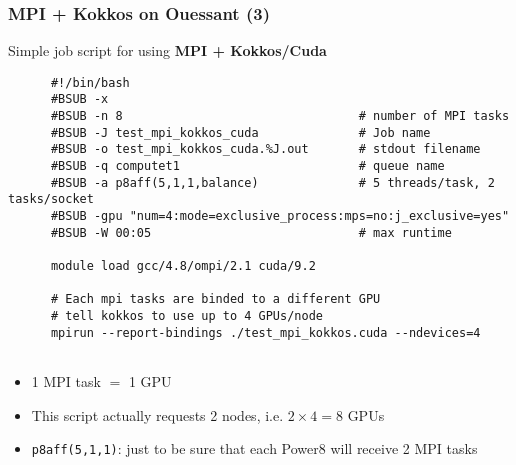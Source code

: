\begin{frame}[fragile=singleslide]
  \frametitle{MPI + Kokkos on Ouessant (3)}

  {\Large Simple job script for using \textbf{MPI + Kokkos/Cuda}}

  {\small
    \begin{verbatim}
      #!/bin/bash
      #BSUB -x
      #BSUB -n 8                                 # number of MPI tasks
      #BSUB -J test_mpi_kokkos_cuda              # Job name
      #BSUB -o test_mpi_kokkos_cuda.%J.out       # stdout filename
      #BSUB -q computet1                         # queue name
      #BSUB -a p8aff(5,1,1,balance)              # 5 threads/task, 2 tasks/socket
      #BSUB -gpu "num=4:mode=exclusive_process:mps=no:j_exclusive=yes"
      #BSUB -W 00:05                             # max runtime
            
      module load gcc/4.8/ompi/2.1 cuda/9.2
      
      # Each mpi tasks are binded to a different GPU
      # tell kokkos to use up to 4 GPUs/node
      mpirun --report-bindings ./test_mpi_kokkos.cuda --ndevices=4
      
    \end{verbatim}
  }
  \begin{itemize}
  \item 1 MPI task $=$ 1 GPU
  \item This script actually requests 2 nodes, i.e. $2\times4=8$ GPUs
  \item \texttt{p8aff(5,1,1)}: just to be sure that each Power8 will receive 2 MPI tasks
  \end{itemize}
\end{frame}

